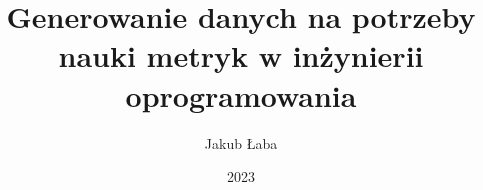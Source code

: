 \documentclass[thesis=inz,faculty=ee]{EE-dyplom}
\title{Generowanie danych na potrzeby nauki metryk w inżynierii oprogramowania}
\author{Jakub Łaba}
\date{2023}
\begin{document}
    \frontpages

    

    \bibliografia

    
\end{document}
